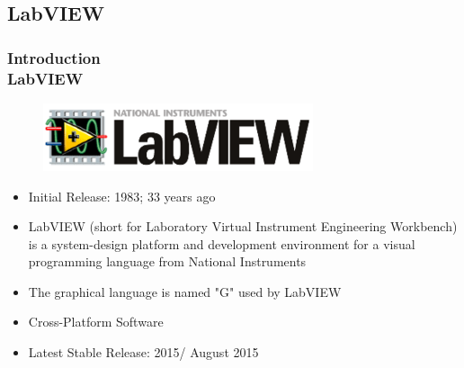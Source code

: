 \documentclass[hyperref={pdfpagelabels=true}]{beamer}
\begin{document}
\subsection{LabVIEW}
\begin{frame}
\frametitle{Introduction\\ {\large LabVIEW}}
\begin{figure}[!tbp]
\centering
\includegraphics[scale = 0.5]{figs/fg.png}
\end{figure}
\begin{itemize}
\item Initial Release: 1983; 33 years ago
\item LabVIEW (short for Laboratory Virtual Instrument Engineering Workbench) is a system-design platform and development environment for a visual programming language from National Instruments
\item The graphical language is named "G" used by LabVIEW
\item Cross-Platform Software
\item Latest Stable Release: 2015/ August 2015
\end{itemize}
\end{frame}







\end{document}
